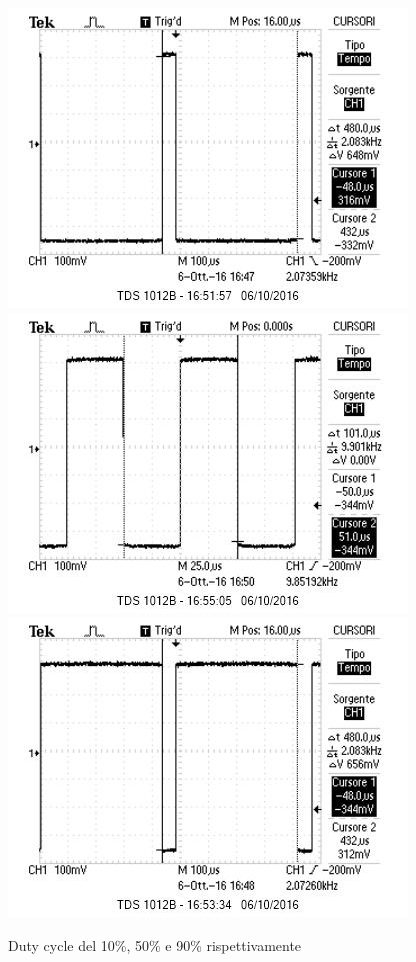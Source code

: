 \documentclass[10pt,a4paper]{article}
\begin{document}
\begin{figure}[h]
	\centering
	\includegraphics[scale=0.5]{../Oscilloscopio/10percento.jpg}
	\includegraphics[scale=0.5]{../Oscilloscopio/50percento.jpg}
	\includegraphics[scale=0.5]{../Oscilloscopio/90percento.jpg}
	\caption{Duty cycle del 10\%, 50\% e 90\% rispettivamente}
	\label{f:duty}
\end{figure}
\end{document}
